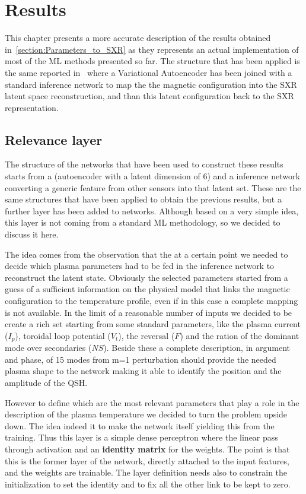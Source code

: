 \chapter{Results}
\label{section:7_Results}

This chapter presents a more accurate description of the results obtained in~\cref{section:Parameters_to_SXR} as they represents an actual implementation of most of the ML methods presented so far.
The structure that has been applied is the same reported in~\Figure{\ref{fig:SXR_from_param}} where a Variational Autoencoder has been joined with a standard inference network to map the the magnetic configuration into the SXR latent space reconstruction, and than this latent configuration back to the SXR representation.

\section{Relevance layer}

The structure of the networks that have been used to construct these results starts from a  (autoencoder with a latent dimension of 6) and a inference network converting a generic feature from other sensors into that latent set.
These are the same structures that have been applied to obtain the previous results, but a further layer has been added to networks. Although based on a very simple idea, this layer is not coming from a standard ML methodology, so we decided to discuss it here. 

The idea comes from the observation that the at a certain point we needed to decide which plasma parameters had to be fed in the inference network to reconstruct the latent state. Obviously the selected parameters started from a guess of a sufficient information on the physical model that links the magnetic configuration to the temperature profile, even if in this case a complete mapping is not available.
In the limit of a reasonable number of inputs we decided to be create a rich set starting from some standard parameters, like the plasma current ($I_p$), toroidal loop potential ($V_t$), the reversal ($F$) and the ration of the dominant mode over secondaries ($NS$). Beside these a complete description, in argument and phase, of 15 modes from m=1 perturbation should provide the needed plasma shape to the network making it able to identify the position and the amplitude of the QSH.

However to define which are the most relevant parameters that play a role in the description of the plasma temperature we decided to turn the problem upside down. The idea indeed it to make the network itself yielding this from the training. Thus this layer is a simple dense perceptron where the linear pass through activation and an \textbf{identity matrix} for the weights. The point is that this is the former layer of the network, directly attached to the input features, and the weights are trainable. The layer definition needs also to constrain the initialization to set the identity and to fix all the other link to be kept to zero. 

